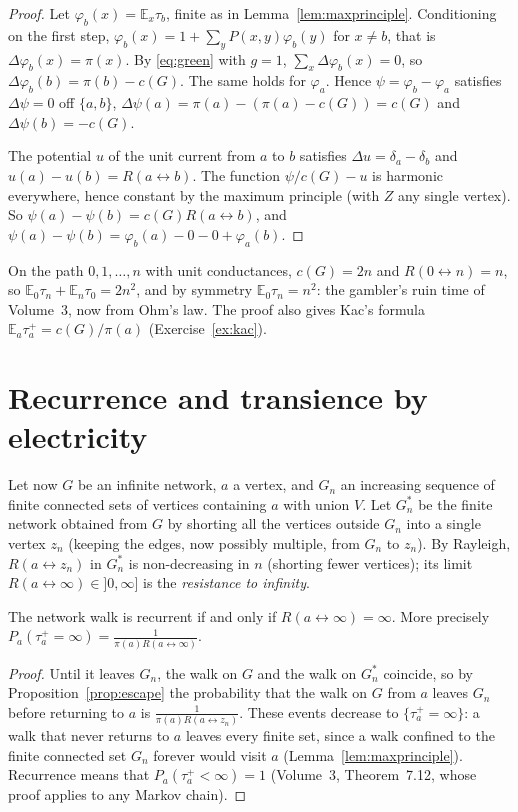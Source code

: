 \begin{proof}
Let $\varphi_b(x)=\mathbb E_x\tau_b$, finite as in Lemma~\ref{lem:maxprinciple}. Conditioning on the first step, $\varphi_b(x)=1+\sum_yP(x,y)\varphi_b(y)$ for $x\ne b$, that is $\Delta\varphi_b(x)=\pi(x)$. By \eqref{eq:green} with
$g=1$, $\sum_x\Delta\varphi_b(x)=0$, so $\Delta\varphi_b(b)=\pi(b)-c(G)$. The same holds for $\varphi_a$. Hence $\psi=\varphi_b-\varphi_a$ satisfies $\Delta\psi=0$ off $\{a,b\}$, $\Delta\psi(a)=\pi(a)-(\pi(a)-c(G))=c(G)$ and
$\Delta\psi(b)=-c(G)$.

The potential $u$ of the unit current from $a$ to $b$ satisfies $\Delta u=\delta_a-\delta_b$ and $u(a)-u(b)=R(a\leftrightarrow b)$. The function $\psi/c(G)-u$ is harmonic everywhere, hence constant by the maximum principle (with
$Z$ any single vertex). So $\psi(a)-\psi(b)=c(G)R(a\leftrightarrow b)$, and $\psi(a)-\psi(b)=\varphi_b(a)-0-0+\varphi_a(b)$.
\end{proof}

On the path $0,1,\dots,n$ with unit conductances, $c(G)=2n$ and $R(0\leftrightarrow n)=n$, so $\mathbb E_0\tau_n+\mathbb E_n\tau_0=2n^2$, and by symmetry $\mathbb E_0\tau_n=n^2$: the gambler's ruin time of Volume~3, now from Ohm's law. The proof also
gives Kac's formula $\mathbb E_a\tau_a^+=c(G)/\pi(a)$ (Exercise~\ref{ex:kac}).

\section{Recurrence and transience by electricity}

Let now $G$ be an infinite network, $a$ a vertex, and $G_n$ an increasing sequence of finite connected sets of vertices containing $a$ with union $V$. Let $G_n^*$ be the finite network obtained from $G$ by shorting all the
vertices outside $G_n$ into a single vertex $z_n$ (keeping the edges, now possibly multiple, from $G_n$ to $z_n$). By Rayleigh, $R(a\leftrightarrow z_n)$ in $G_n^*$ is non-decreasing in $n$ (shorting fewer vertices); its limit
$R(a\leftrightarrow\infty)\in]0,\infty]$ is the \emph{resistance to infinity}.

\begin{theorem}\label{thm:recurrentR}
The network walk is recurrent if and only if $R(a\leftrightarrow\infty)=\infty$. More precisely $P_a(\tau_a^+=\infty)=\frac1{\pi(a)R(a\leftrightarrow\infty)}$.
\end{theorem}

\begin{proof}
Until it leaves $G_n$, the walk on $G$ and the walk on $G_n^*$ coincide, so by Proposition~\ref{prop:escape} the probability that the walk on $G$ from $a$ leaves $G_n$ before returning to $a$ is $\frac1{\pi(a)R(a\leftrightarrow z_n)}$. These events
decrease to $\{\tau_a^+=\infty\}$: a walk that never returns to $a$ leaves every finite set, since a walk confined to the finite connected set $G_n$ forever would visit $a$ (Lemma~\ref{lem:maxprinciple}). Recurrence means that
$P_a(\tau_a^+<\infty)=1$ (Volume~3, Theorem~7.12, whose proof applies to any Markov chain).
\end{proof}


